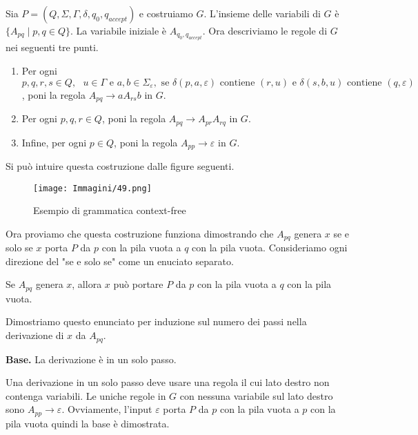 \documentclass{article}
\begin{document}
Sia $P = (Q,\Sigma,\Gamma,\delta,q_{0},q_{accept})$ e costruiamo $G$.
L'insieme delle variabili di $G$ è $\{A_{pq} \mid p,q \in Q\}$.
La variabile iniziale è $A_{q_{0},q_{accept}}$.
Ora descriviamo le regole di $G$ nei seguenti tre punti.
\begin{enumerate}
    \item Per ogni $p,q,r,s \in Q,\text{ } u \in \Gamma \text{ e } a,b \in \Sigma_\varepsilon, \text{ se } \delta(p,a,\varepsilon)\text{ contiene } (r,u) \text{ e } \delta(s,b,u) \text{ contiene } (q,\varepsilon)$, poni la regola $A_{pq} \rightarrow aA_{rs}b$ in $G$.
    \item Per ogni $p,q,r \in Q$, poni la regola $A_{pq} \rightarrow A_{pr}A_{rq}$ in $G$.
    \item Infine, per ogni $p \in Q$, poni la regola $A_{pp} \rightarrow \varepsilon$ in $G$.
\end{enumerate}

Si può intuire questa costruzione dalle figure seguenti.

\begin{figure}[H]
    \centering
    \texttt{[image: Immagini/49.png]}
    \caption{Esempio di grammatica context-free}
    \label{fig:your_image}
\end{figure}

Ora proviamo che questa costruzione funziona dimostrando che $A_{pq}$ genera $x$ se e solo se $x$ porta $P$ da $p$ con la pila vuota a $q$ con la pila vuota.
Consideriamo ogni direzione del "se e solo se" come un enuciato separato.

\begin{tcolorbox}[colback=yellow!10!white, colframe=yellow!50!black, title=Fatto 2.30]
    Se $A_{pq}$ genera $x$, allora $x$ può portare $P$ da $p$ con la pila vuota a $q$ con la pila vuota.
\end{tcolorbox}

Dimostriamo questo enunciato per induzione sul numero dei passi nella derivazione di $x$ da $A_{pq}$.
\vspace{1em}

\textbf{Base.}
La derivazione è in un solo passo.

Una derivazione in un solo passo deve usare una regola il cui lato destro non contenga variabili.
Le uniche regole in $G$ con nessuna variabile sul lato destro sono $A_{pp} \rightarrow \varepsilon$.
Ovviamente, l'input $\varepsilon$ porta $P$ da $p$ con la pila vuota a $p$ con la pila vuota quindi la base è dimostrata.
\vspace{1em}
\end{document}
